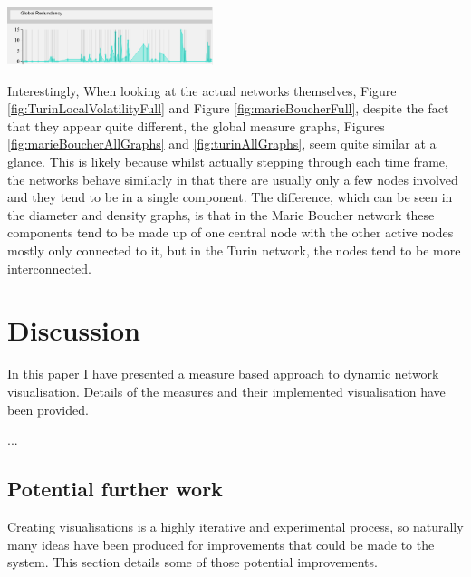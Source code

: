 \begin{multicols}{2}
\begin{center}
\end{center}
\begin{center}
\includegraphics[trim={0 0 0 0}, width=60mm]{./Figures/TurinGlobalRedundancy.png}
\end{center}
\label{fig:turinAllGraphs}
\end{multicols}

Interestingly, When looking at the actual networks themselves, Figure \ref{fig:TurinLocalVolatilityFull} and Figure \ref{fig:marieBoucherFull}, despite the fact that they appear quite different, the global measure graphs, Figures \ref{fig:marieBoucherAllGraphs} and \ref{fig:turinAllGraphs}, seem quite similar at a glance. This is likely because whilst actually stepping through each time frame, the networks behave similarly in that there are usually only a few nodes involved and they tend to be in a single component. The difference, which can be seen in the diameter and density graphs, is that in the Marie Boucher network these components tend to be made up of one central node with the other active nodes mostly only connected to it, but in the Turin network, the nodes tend to be more interconnected.


\chapter{Discussion}

In this paper I have presented a measure based approach to dynamic network visualisation. Details of the measures and their implemented visualisation have been provided.

...

\section{Potential further work} 
Creating visualisations is a highly iterative and experimental process, so naturally many ideas have been produced for improvements that could be made to the system. This section details some of those potential improvements.
\newline


